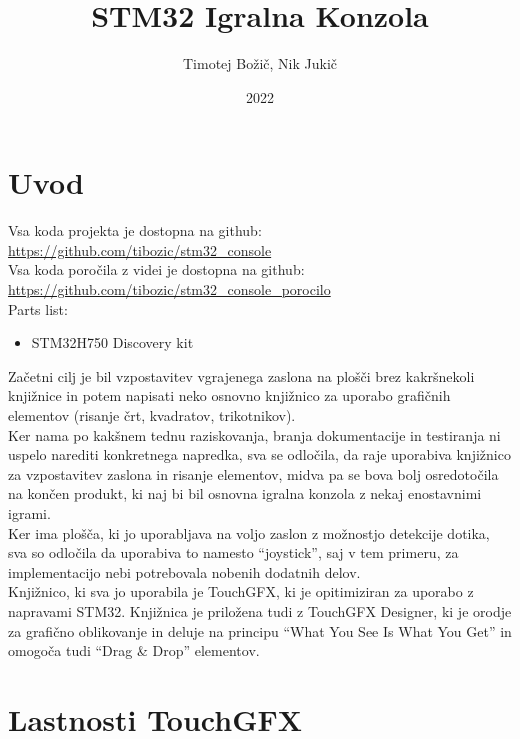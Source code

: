 \documentclass{article}
\author{Timotej Bo\v{z}i\v{c}, Nik Juki\v{c}}
\title{STM32 Igralna Konzola}
\date{2022}
\begin{document}
\maketitle

\tableofcontents

\clearpage

\section{Uvod}
\noindent
Vsa koda projekta je dostopna na github: \href{https://github.com/tibozic/stm32_console}{https://github.com/tibozic/stm32\_console} \\
Vsa koda poro\v{c}ila z videi je dostopna na github: \href{https://github.com/tibozic/stm32_console_porocilo}{https://github.com/tibozic/stm32\_console\_porocilo} \\

\noindent
Parts list:
\begin{itemize}
  \item STM32H750 Discovery kit
\end{itemize}

\noindent
Za\v{c}etni cilj je bil vzpostavitev vgrajenega zaslona na
plo\v{s}\v{c}i brez kakr\v{s}nekoli knji\v{z}nice in potem napisati
neko osnovno knji\v{z}nico za uporabo grafi\v{c}nih elementov
(risanje \v{c}rt, kvadratov, trikotnikov). \\
Ker nama po kak\v{s}nem tednu raziskovanja, branja dokumentacije in testiranja
ni uspelo narediti konkretnega napredka, sva se
odlo\v{c}ila, da raje uporabiva knji\v{z}nico za vzpostavitev
zaslona in risanje elementov, midva pa se bova bolj osredoto\v{c}ila
na kon\v{c}en produkt, ki naj bi bil osnovna igralna konzola z nekaj
enostavnimi igrami. \\
Ker ima plo\v{s}\v{c}a, ki jo uporabljava na voljo zaslon z mo\v{z}nostjo
detekcije dotika, sva so odlo\v{c}ila da uporabiva to namesto ``joystick'',
saj v tem primeru, za implementacijo nebi potrebovala nobenih dodatnih
delov. \\

\noindent
Knji\v{z}nico, ki sva jo uporabila je TouchGFX, ki je opitimiziran za
uporabo z napravami STM32. Knji\v{z}nica je prilo\v{z}ena tudi z
TouchGFX Designer, ki je orodje za grafi\v{c}no oblikovanje in deluje
na principu ``What You See Is What You Get'' in omogo\v{c}a tudi
``Drag \& Drop'' elementov. \\

\section{Lastnosti TouchGFX}
\end{document}
